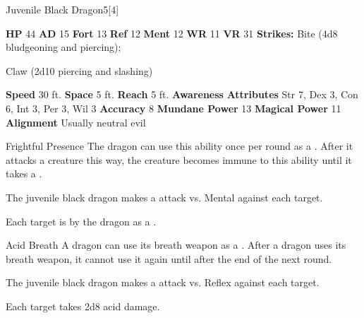   \begin{monsubsection}{Juvenile Black Dragon}{5}[4]
    \vspace{-1em}\vspace{-1em}
    \vspace{0em}

    
    

    \begin{spellcontent}
      \begin{spelltargetinginfo}
        \pari \textbf{HP} 44 \monsep
          \textbf{AD} 15 \monsep
          \textbf{Fort} 13 \monsep
          \textbf{Ref} 12 \monsep
          \textbf{Ment} 12
        \pari \textbf{WR} 11 \monsep
        \textbf{VR} 31
        \pari \textbf{Strikes:}
            Bite  (4d8 bludgeoning and piercing);
\par Claw  (2d10 piercing and slashing)
      \end{spelltargetinginfo}
    \end{spellcontent}
    \begin{monsterfooter}
      \pari \textbf{Speed} 30 ft. \monsep
        \textbf{Space} 5 ft. \monsep
        \textbf{Reach} 5 ft.
      \pari \textbf{Awareness} 
      \pari \textbf{Attributes}
        Str 7, Dex 3,
        Con 6, Int 3,
        Per 3, Wil 3
      \pari \textbf{Accuracy} 8 \monsep
        \textbf{Mundane Power} 13 \monsep
      \textbf{Magical Power} 11
      \pari \textbf{Alignment} Usually neutral evil
    \end{monsterfooter}
  \end{monsubsection}
  \begin{freeability}{Frightful Presence}
      The dragon can use this ability once per round as a .
      After it attacks a creature this way, the creature becomes immune to this ability until it takes a .
      \par The juvenile black dragon makes a  attack
        vs. Mental against each target.
    
    \hit Each target is  by the dragon as a .
    \end{freeability}
  

    \begin{freeability}{Acid Breath}
      A dragon can use its breath weapon as a .
      After a dragon uses its breath weapon, it cannot use it again until after the end of the next round.
      \par The juvenile black dragon makes a  attack
        vs. Reflex against each target.
    
    \hit Each target takes 2d8 acid damage.
    \end{freeability}
  

